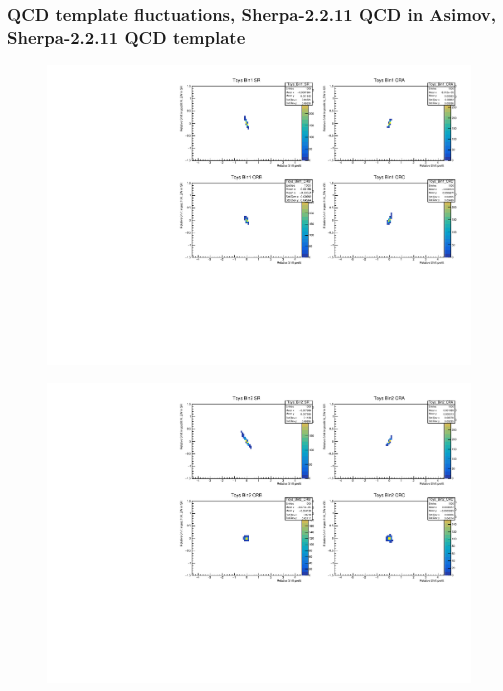 \subsubsection{\mjj QCD template fluctuations, Sherpa-2.2.11 QCD in Asimov, Sherpa-2.2.11 QCD template}
\begin{figure}[H]
\includegraphics[width=\textwidth]{plots/diffx/instab/constfx/instabilities_mjj_QCD_Sh2211_Signal_Sh2211_BSMCQCDSTATS_sherpaasimov_bin1.pdf}
\end{figure}
\begin{figure}[H]
\includegraphics[width=\textwidth]{plots/diffx/instab/constfx/instabilities_mjj_QCD_Sh2211_Signal_Sh2211_BSMCQCDSTATS_sherpaasimov_bin2.pdf}
\end{figure}
